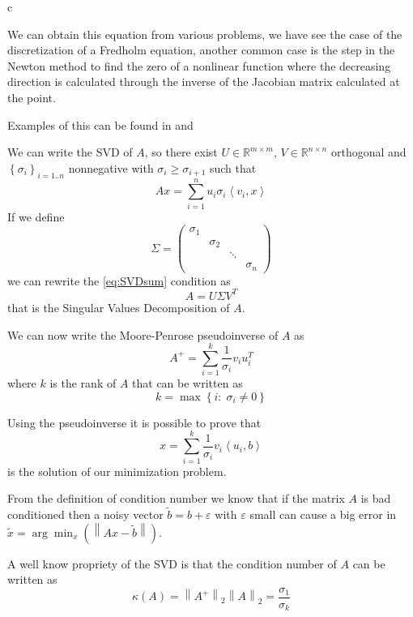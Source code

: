c\documentclass[a4paper,10pt]{article}
\theoremstyle{plain}
\theoremstyle{definition}
\theoremstyle{remark}
\newcommand{\set}[1]{\left\{#1\right\}}
\newcommand{\pa}[1]{\left(#1\right)}
\newcommand{\ang}[1]{\left<#1\right>}
\newcommand{\norm}[1]{\left\|#1\right\|}
\begin{document}
We can obtain this equation from various problems, we have see the
case of the discretization of a Fredholm equation, another common case
is the step in the Newton method to find the zero of a nonlinear
function where the decreasing direction is calculated through the
inverse of the Jacobian matrix calculated at the point.

Examples of this can be found in \cite{inversesturm} and \cite{atmospheric}

We can write the SVD of $A$, so there exist $U\in \mathbb{R}^{m\times
  m}$, $V\in \mathbb{R}^{n\times n}$ orthogonal and $\set{\sigma
  _i}_{i=1..n}$ nonnegative with $\sigma _i \ge \sigma _{i+1}$ such that
\begin{equation}
  \label{eq:SVDsum}
  Ax = \sum _{i=1} ^n u_i \sigma _i \ang{v_i,x}
\end{equation}
If we define
\[ \Sigma = \begin{pmatrix}
\sigma _1 & & & \\
& \sigma _2 & &  \\
& & \ddots & \\
& & & \sigma _n 
\end{pmatrix} \]
we can rewrite the \ref{eq:SVDsum} condition as
\begin{equation}
  \label{eq:SVDmat}
  A = U\Sigma V^T
\end{equation}
that is the Singular Values Decomposition of $A$.

We can now write the Moore-Penrose pseudoinverse of $A$ as
\begin{equation}
  \label{eq:pseudoinverse}
  A^+ = \sum _{i=1} ^k \frac{1}{\sigma _i} v_i u_i ^T 
\end{equation}
where $k$ is the rank of $A$ that can be written as
\[ k = \max \set{ i :\; \sigma_i \neq 0 } \]

Using the pseudoinverse it is possible to prove that
\begin{equation}
  \label{eq:inverseSVDunreg}
  x = \sum _{i=1} ^k \frac{1}{\sigma _i} v_i \ang{u_i,b}
\end{equation}
is the solution of our minimization problem.

From the definition of condition number we know that if the matrix $A$
is bad conditioned then a noisy vector $\tilde b = b + \varepsilon$
with $\varepsilon$ small can cause a big error in $\tilde x = \arg\min _{x}
\pa{ \norm{ Ax - \tilde b }}$.

A well know propriety of the SVD is that the condition number of $A$
can be written as
\[ \kappa (A) = \norm{A^+}_2\norm{A}_2 = \frac{\sigma _1}{\sigma _k} \]
\end{document}
